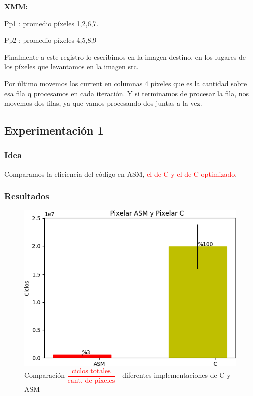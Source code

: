 \par{\textbf{XMM:}}
\par {Pp1 : promedio píxeles {1,2,6,7}.}
\par{Pp2 : promedio píxeles {4,5,8,9}}
	
\par{Finalmente a este registro lo escribimos en la imagen destino, en los lugares de los píxeles que levantamos en la imagen src.}
\par{Por último movemos los current en columnas 4 píxeles que es la cantidad sobre esa fila q procesamos en cada iteración. Y si terminamos de procesar la fila, nos movemos dos filas, ya que vamos procesando dos juntas a la vez.}
	
\subsection{Experimentación 1}

\subsubsection{Idea}	
\par{Comparamos la eficiencia del código en ASM, \textcolor{red}{el de C y el de C optimizado}.}
	
\subsubsection{Resultados}
	\begin{figure}[H]
	\centering
	\includegraphics[width = 10 cm, height = 6.5 cm]{imagenes/ASMvsCPixelar.png}
	\caption[center]{Comparación \textcolor{red}{$\dfrac{\text{ciclos totales}}{\text{cant. de píxeles}}$} - diferentes implementaciones de C y ASM}
\end{figure}

